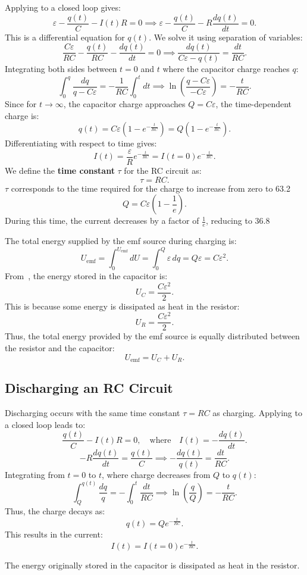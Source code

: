 Applying  to a closed loop gives:
\[
    \varepsilon - \frac{q(t)}{C} - I(t)R = 0 \implies \varepsilon - \frac{q(t)}{C} - R \frac{dq(t)}{dt} = 0.
\]
This is a differential equation for $q(t)$.
We solve it using separation of variables:
\[
    \frac{C\varepsilon}{RC} - \frac{q(t)}{RC} - \frac{dq(t)}{dt} = 0 \implies \frac{dq(t)}{C\varepsilon -q(t)} = \frac{dt}{RC}.
\]
Integrating both sides between $t=0$ and $t$ where the capacitor charge reaches $q$:
\[
    \int_0^q \frac{dq}{q-C\varepsilon} = -\frac{1}{RC}\int_0^t dt \implies \ln\left(\frac{q-C\varepsilon}{-C\varepsilon}\right) = -\frac{t}{RC}.
\]
Since for $t \to \infty$, the capacitor charge approaches $Q = C\varepsilon$, the time-dependent charge is:
\[
    q(t) = C\varepsilon\left(1-e^{-\frac{t}{RC}}\right) = Q\left(1-e^{-\frac{t}{RC}}\right).
\]
Differentiating with respect to time gives:
\[
    I(t) = \frac{\varepsilon}{R}e^{-\frac{t}{RC}} = I(t=0)e^{-\frac{t}{RC}}.
\]
We define the \textbf{time constant} $\tau$ for the RC circuit as:
\[
    \tau = RC.
\]
$\tau$ corresponds to the time required for the charge to increase from zero to 63.2%
\[
    Q = C\varepsilon(1-\frac{1}{e}).
\]
During this time, the current decreases by a factor of $\frac{1}{e}$, reducing to 36.8%

The total energy supplied by the emf source during charging is:
\[
    U_{\text{emf}} = \int_0^{U_{\text{emf}}} dU = \int_0^Q \varepsilon\,dq = Q\varepsilon = C\varepsilon^2.
\]
From~\cite[Ch. 24]{giancoli}, the energy stored in the capacitor is:
\[
    U_C = \frac{C\varepsilon^2}{2}.
\]
This is because some energy is dissipated as heat in the resistor:
\[
    U_R = \frac{C\varepsilon^2}{2}.
\]
Thus, the total energy provided by the emf source is equally distributed between the resistor and the capacitor:
\[
    U_{\text{emf}} = U_C + U_R.
\]


\subsection{Discharging an RC Circuit}

Discharging occurs with the same time constant $\tau = RC$ as charging.
Applying  to a closed loop leads to:
\[
    \frac{q(t)}{C} - I(t)R = 0, \quad \text{where} \quad I(t) = -\frac{dq(t)}{dt}.
\]
\[
    -R \frac{dq(t)}{dt} = \frac{q(t)}{C} \implies -\frac{dq(t)}{q(t)} = \frac{dt}{RC}.
\]
Integrating from $t=0$ to $t$, where charge decreases from $Q$ to $q(t)$:
\[
    \int_Q^{q(t)}\frac{dq}{q} = -\int_0^t \frac{dt}{RC} \implies \ln\left(\frac{q}{Q}\right) = -\frac{t}{RC}.
\]
Thus, the charge decays as:
\[
    q(t) = Qe^{-\frac{t}{RC}}.
\]
This results in the current:
\[
    I(t) = I(t=0)e^{-\frac{t}{RC}}.
\]

The energy originally stored in the capacitor is dissipated as heat in the resistor.
